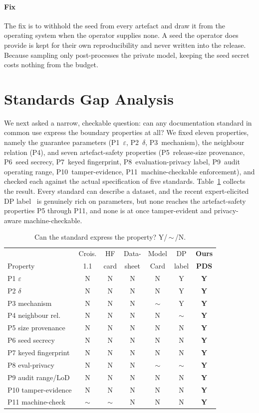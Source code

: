 \documentclass[conference]{IEEEtran}
\newcommand{\eps}{\varepsilon}
\begin{document}
\paragraph{Fix} The fix is to withhold the seed from every artefact and draw it from the operating
system when the operator supplies none. A seed the operator does provide is kept for their own
reproducibility and never written into the release. Because sampling only post-processes the private
model, keeping the seed secret costs nothing from the budget.

\section{Standards Gap Analysis}
We next asked a narrow, checkable question: can any documentation standard in common use express the
boundary properties at all? We fixed eleven properties, namely the guarantee parameters (P1~$\eps$,
P2~$\delta$, P3~mechanism), the neighbour relation (P4), and seven artefact-safety properties
(P5~release-size provenance, P6~seed secrecy, P7~keyed fingerprint, P8~evaluation-privacy label,
P9~audit operating range, P10~tamper-evidence, P11~machine-checkable enforcement), and checked each
against the actual specification of five standards. Table~\ref{tab:gap} collects the result. Every
standard can describe a dataset, and the recent expert-elicited DP label~\cite{dibia2026} is genuinely
rich on parameters, but none reaches the artefact-safety properties P5 through P11, and none is at once
tamper-evident and privacy-aware machine-checkable.

\begin{table}[t]
\caption{Can the standard express the property? Y/\,$\sim$\,/N.}
\label{tab:gap}
\centering
\setlength{\tabcolsep}{4pt}
\begin{tabular}{lccccc|c}
\toprule
 & Crois. & HF & Data- & Model & DP & \textbf{Ours} \\
Property & 1.1 & card & sheet & Card & label & \textbf{PDS} \\
\midrule
P1 $\eps$            & N & N & N & N & Y & \textbf{Y} \\
P2 $\delta$          & N & N & N & N & Y & \textbf{Y} \\
P3 mechanism         & N & N & N & $\sim$ & Y & \textbf{Y} \\
P4 neighbour rel.    & N & N & N & N & $\sim$ & \textbf{Y} \\
P5 size provenance   & N & N & N & N & N & \textbf{Y} \\
P6 seed secrecy      & N & N & N & N & N & \textbf{Y} \\
P7 keyed fingerprint & N & N & N & N & N & \textbf{Y} \\
P8 eval-privacy      & N & N & N & $\sim$ & $\sim$ & \textbf{Y} \\
P9 audit range/LoD   & N & N & N & N & N & \textbf{Y} \\
P10 tamper-evidence  & N & N & N & N & N & \textbf{Y} \\
P11 machine-check    & $\sim$ & $\sim$ & N & N & N & \textbf{Y} \\
\bottomrule
\end{tabular}
\end{table}
\end{document}
